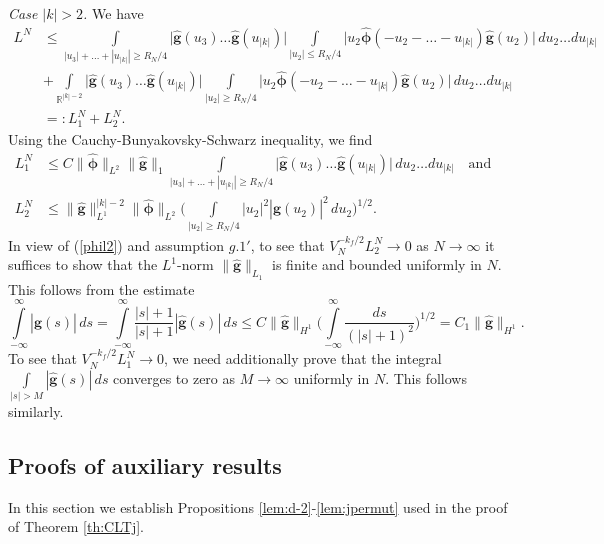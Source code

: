 \documentclass{article}
\numberwithin{equation}{section}
\newcommand{\mR}{\mathbb{R}}
\newcommand{\ra}{\rightarrow}
\newcommand{\fr}{\frac}
\newcommand{\qnd}{\quad\mbox{and}\quad}
\newcommand{\ili}{\int\limits}
\newcommand{\ilif}{\ili_{-\infty}^\infty}
\newcommand{\lbl}{\label}
\newcommand{\rtheo}{Theorem \nolinebreak}
\newcommand{\bee}{\begin{equation}}
\newcommand{\eee}{\end{equation}}
\newcommand{\non}{\nonumber}
\begin{document}
{\it Case $|k|>2$.}
We have
\begin{align}\non
L^N
	&\leq\ili_{|u_3|+\ldots+|u_{|k|}|\geq R_N/4}
		\big|\hat {\bm g}(u_3)\ldots \hat {\bm g}(u_{|k|})\big|
		\ili_{|u_2|\leq R_N/4}
		\big|u_2	\hat {\bm \phi}(-u_2-\ldots-u_{|k|})\hat {\bm g}(u_2)\big|
		\,du_2\ldots du_{|k|}
	\\\non
	&+\ili_{\mR^{|k|-2}}
		\big|\hat {\bm g}(u_3)\ldots \hat {\bm g}(u_{|k|})\big|
		\ili_{|u_2|\geq R_N/4}
		\big|u_2	\hat {\bm \phi}(-u_2-\ldots-u_{|k|})\hat {\bm g}(u_2)\big|		\,du_2\ldots du_{|k|}
		\\\non
		&=:L^N_1+L^N_2.
\end{align}
Using the Cauchy-Bunyakovsky-Schwarz inequality, we find
\begin{align}\non
L^N_1
	&\leq
		C\|\hat {\bm \phi}\|_{L^2} \|\hat {\bm g}\|_{1}
		\ili_{|u_3|+\ldots+|u_{|k|}|\geq R_N/4}
		\big|\hat {\bm g}(u_3)\ldots \hat {\bm g}(u_{|k|})\big|\,du_2\ldots du_{|k|}
\qnd
\\\non
L_2^N
	&\leq
		\|\hat {\bm g}\|_{L^1}^{|k|-2}\|\hat {\bm \phi}\|_{L^2}
		\Big(\ili_{|u_2|\geq R_N/4} |u_2|^2 |\hat {\bm g}(u_2)|^2\,du_2\Big)^{1/2}.
\end{align}
In view of (\ref{phil2}) and assumption $g.1'$,
to see that
$V_N^{-k_f/2}L^N_2\ra 0$ as $N\ra\infty$
it suffices to show that the $L^1$-norm
$\|\hat {\bm g}\|_{L_1}$ is finite and bounded uniformly in $N$.
This follows from the estimate
\bee\lbl{harm}
\ilif |\hat {\bm g}(s)| \,ds
=\ilif\fr{|s|+1}{|s|+1}|\hat {\bm g}(s)|\, ds
\leq C\|\hat {\bm g}\|_{H^{1}}
\Big(\ilif \fr{ds}{(|s|+1)^{2}}\Big)^{1/2}
=C_1\|\hat {\bm g}\|_{H^{1}}.
\eee
To see that $V_N^{-k_f/2}L^N_1\ra 0$,
we need additionally prove that
the integral
$
\ili_{|s|>M} |\hat {\bm g}(s)| \,ds
$
converges to zero as $M\ra\infty$ uniformly in $N$.
This follows similarly.


\subsection{Proofs of auxiliary results}
\lbl{sec:prop}

In this section we establish Propositions \ref{lem:d-2}-\ref{lem:jpermut}
used in the proof of \rtheo \ref{th:CLTj}.
\end{document}
